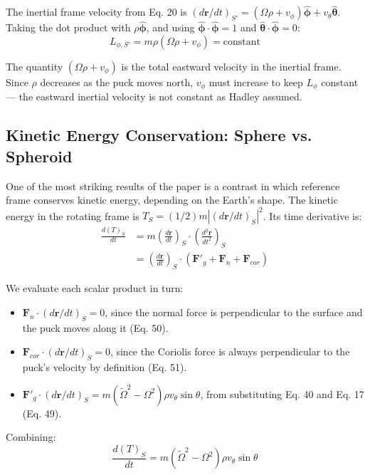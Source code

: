 \documentclass[10pt, a4paper]{article}
\begin{document}
The inertial frame velocity from Eq. 20 is $(d\mathbf{r}/dt)_{S'} = (\Omega\rho + v_\phi)\hat{\boldsymbol{\phi}} + v_\theta\hat{\boldsymbol{\theta}}$. Taking the dot product with $\rho\hat{\boldsymbol{\phi}}$, and using $\hat{\boldsymbol{\phi}} \cdot \hat{\boldsymbol{\phi}} = 1$ and $\hat{\boldsymbol{\theta}} \cdot \hat{\boldsymbol{\phi}} = 0$:
\begin{equation}
L_{\phi, S'} = m\rho(\Omega\rho + v_\phi) = \text{constant} \label{eq:46}
\end{equation}

The quantity $(\Omega\rho + v_\phi)$ is the total eastward velocity in the inertial frame. Since $\rho$ decreases as the puck moves north, $v_\phi$ must increase to keep $L_\phi$ constant — the eastward inertial velocity is not constant as Hadley assumed.

\subsection{Kinetic Energy Conservation: Sphere vs. Spheroid}
One of the most striking results of the paper is a contrast in which reference frame conserves kinetic energy, depending on the Earth’s shape. The kinetic energy in the rotating frame is $T_S = (1/2)m|(d\mathbf{r}/dt)_S|^2$. Its time derivative is:
\begin{align}
\frac{d(T)_S}{dt} &= m\left(\frac{d\mathbf{r}}{dt}\right)_S \cdot \left(\frac{d^2\mathbf{r}}{dt^2}\right)_S \nonumber \\
&= \left(\frac{d\mathbf{r}}{dt}\right)_S \cdot (\mathbf{F}'_g + \mathbf{F}_n + \mathbf{F}_{cor}) \label{eq:48b}
\end{align}

We evaluate each scalar product in turn: 
\begin{itemize}
    \item $\mathbf{F}_n \cdot (d\mathbf{r}/dt)_S = 0$, since the normal force is perpendicular to the surface and the puck moves along it (Eq. 50). 
    \item $\mathbf{F}_{cor} \cdot (d\mathbf{r}/dt)_S = 0$, since the Coriolis force is always perpendicular to the puck’s velocity by definition (Eq. 51). 
    \item $\mathbf{F}'_g \cdot (d\mathbf{r}/dt)_S = m(\tilde{\Omega}^2 - \Omega^2)\rho v_\theta \sin\theta$, from substituting Eq. 40 and Eq. 17 (Eq. 49). 
\end{itemize}
Combining:
\begin{equation}
\frac{d(T)_S}{dt} = m(\tilde{\Omega}^2 - \Omega^2)\rho v_\theta \sin\theta \label{eq:52}
\end{equation}
\end{document}
